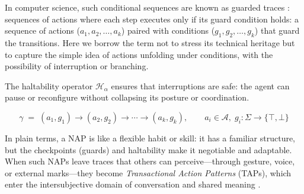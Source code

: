 In computer science, such conditional sequences are known as guarded traces \citep{Dijkstra1975,BaetenWeijland1990}: sequences of actions where each step executes only if its guard condition holds:  a sequence of actions ($a_1,a_2,\ldots,a_k$) paired with conditions ($g_1,g_2,\ldots,g_k$) that guard the transitions. Here we borrow the term not to stress its technical heritage but to capture the simple idea of actions unfolding under conditions, with the possibility of interruption or branching.

The haltability operator $\mathcal{H}_\alpha$ ensures that interruptions are safe: the agent can pause or reconfigure without collapsing its posture or coordination.

\[
\gamma \;=\; (a_1, g_1)\to (a_2, g_2)\to \cdots \to (a_k, g_k), 
\qquad a_i\in \mathcal{A},\; g_i:\Sigma\to\{\top,\bot\}
\]

\begin{center}
\end{center}
\vspace{-1ex}

In plain terms, a NAP is like a flexible habit or skill: it has a familiar structure, but the checkpoints (guards) and haltability make it negotiable and adaptable. 
When such NAPs leave traces that others can perceive—through gesture, voice, or external marks—they become \emph{Transactional Action Patterns} (TAPs), which enter the intersubjective domain of conversation and shared meaning \citep{Gibson1979,PezzuloCisek2016}.


